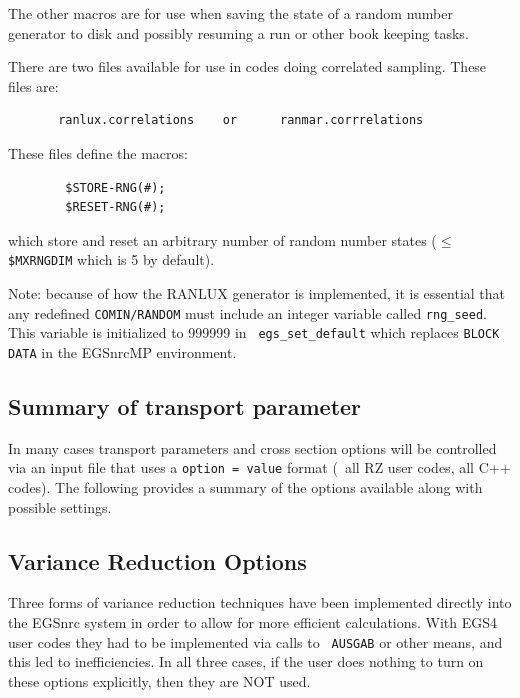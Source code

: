 The other macros are for use when saving the state of a random number
generator to disk and possibly resuming a run or other book keeping tasks.

There are two files available for use in codes doing correlated
sampling.  These files are:
\begin{verbatim}
       ranlux.correlations    or      ranmar.corrrelations
\end{verbatim}
These files define the macros:
\begin{verbatim}
        $STORE-RNG(#);
        $RESET-RNG(#);
\end{verbatim}
which store and reset an arbitrary number of random number states ($\le${\tt
\$MXRNGDIM} which is 5 by default).

Note: because of how the RANLUX generator is implemented, it is essential
that any redefined {\tt COMIN/RANDOM} must include an integer variable
called {\tt rng\_seed}. This variable is initialized to 999999 in {\tt
egs\_set\_default} which replaces {\tt BLOCK DATA} in the EGSnrcMP
environment\cite{Ka03}.
 

\subsection{Summary of transport parameter}
\label{param_options}


In many cases transport parameters and cross section options will be
controlled via an input file that uses a {\tt option = value} format
(\eg~all RZ user codes, all C++ codes). The following provides a summary
of the options available along with possible settings.


\subsection{Variance Reduction Options}
\label{VRO}
Three forms of variance reduction techniques have been implemented directly
into the EGSnrc system in order to allow for more efficient calculations.
With EGS4 user codes they had to be implemented via calls to {\tt
AUSGAB} or
other means, and this led to inefficiencies.  In all three cases, if the
user does nothing to turn on these options explicitly, then they are NOT
used.

